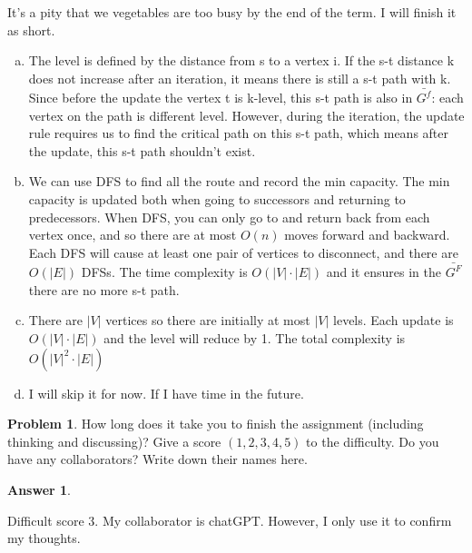 \documentclass{article}
\theoremstyle{definition}
\newtheorem{prob}{Problem}
\newtheorem{ans}{Answer}
\begin{document}
	It's a pity that we vegetables are too busy by the end of the term. I will finish it as short.	
	\begin{enumerate}[(a)]
		\item The level is defined by the distance from s to a vertex i. If the s-t distance k does not increase after an iteration, it means there is still a s-t path with k. Since before the update the vertex t is k-level, this s-t path is also in $\bar{G^f}$: each vertex on the path is different level. However, during the iteration, the update rule requires us to find the critical path on this s-t path, which means after the update, this s-t path shouldn't exist. 
		
		\item We can use DFS to find all the route and record the min capacity. The min capacity is updated both when going to successors and returning to predecessors. When DFS, you can only go to and return back from each vertex once, and so there are at most $O(n)$ moves forward and backward. Each DFS will cause at least one pair of vertices to disconnect, and there are $O(|E|)$ DFSs. The time complexity is $O(|V|\cdot |E|)$ and it ensures in the $\bar{G^F}$ there are no more s-t path. 
		
		\item There are $|V|$ vertices so there are initially at most $|V|$ levels. Each update is $O(|V|\cdot |E|)$ and the level will reduce by 1. The total complexity is $O(|V|^{2}\cdot|E|)$
		
		\item I will skip it for now. If I have time in the future.
		
	\end{enumerate}
	
	\begin{prob}
		How long does it take you to finish the assignment (including thinking and discussing)? Give a score $(1,2,3,4,5)$ to the difficulty. Do you have any collaborators? Write down their names here.
	\end{prob}

	\begin{ans}
		~
		
		Difficult score 3. My collaborator is chatGPT. However, I only use it to confirm my thoughts.
	\end{ans}
\end{document}
